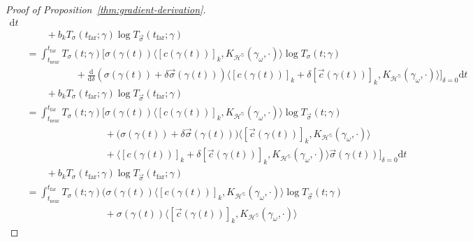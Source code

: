 \documentclass{article}
\newcommand{\dif}{\mathrm{d}}
\newcommand{\near}{\mathrm{near}}
\newcommand{\far}{\mathrm{far}}
\begin{document}
\begin{proof}[Proof of Proposition~\ref{thm:gradient-derivation}]
{\begin{align*}
                \dif t
            \\ &\qquad + b_k T_{\sigma}(t_\far;\gamma) \log T_{\vec{\sigma}}(t_\far;\gamma)
        \\ &=
            \int_{t_\near}^{t_\far}
                T_{\sigma}(t;\gamma)
                \biggl[
                    \sigma(\gamma(t))
                    \langle [c(\gamma(t))]_k, K_{\mathcal{H}^\mathbb{S}}(\gamma_\omega, \cdot) \rangle
                    \log T_{\sigma}(t;\gamma)
                    \\ &\qquad\qquad\quad + \frac{\dif}{\dif \delta}
                    (\sigma(\gamma(t)) + \delta \vec{\sigma}(\gamma(t)))
                    \langle [c(\gamma(t))]_k + \delta [\vec{c}(\gamma(t))]_k, K_{\mathcal{H}^\mathbb{S}}(\gamma_\omega, \cdot) \rangle
                \biggr]_{\delta=0}
                \dif t
            \\ &\qquad + b_k T_{\sigma}(t_\far;\gamma) \log T_{\vec{\sigma}}(t_\far;\gamma)
        \\ &=
            \int_{t_\near}^{t_\far}
                T_{\sigma}(t;\gamma)
                \biggl[
                    \sigma(\gamma(t))
                    \langle [c(\gamma(t))]_k, K_{\mathcal{H}^\mathbb{S}}(\gamma_\omega, \cdot) \rangle
                    \log T_{\vec{\sigma}}(t;\gamma)
                    \\ &\qquad\qquad\qquad\qquad
                    + \bigl(\sigma(\gamma(t)) + \delta \vec{\sigma}(\gamma(t))\bigr) \langle [\vec{c}(\gamma(t))]_k, K_{\mathcal{H}^\mathbb{S}}(\gamma_\omega, \cdot) \rangle
                    \\ &\qquad\qquad\qquad\qquad
                    + \langle [c(\gamma(t))]_k + \delta [\vec{c}(\gamma(t))]_k, K_{\mathcal{H}^\mathbb{S}}(\gamma_\omega, \cdot) \rangle \vec{\sigma}(\gamma(t))
                \biggr]_{\delta=0}
                \dif t
            \\ &\qquad + b_k T_{\sigma}(t_\far;\gamma) \log T_{\vec{\sigma}}(t_\far;\gamma)
        \\ &=
            \int_{t_\near}^{t_\far}
                T_{\sigma}(t;\gamma)
                \biggl(
                    \sigma(\gamma(t))
                    \langle [c(\gamma(t))]_k, K_{\mathcal{H}^\mathbb{S}}(\gamma_\omega, \cdot) \rangle
                    \log T_{\vec{\sigma}}(t;\gamma)
                    \\ &\qquad\qquad\qquad\qquad
                    + \sigma(\gamma(t)) \langle [\vec{c}(\gamma(t))]_k, K_{\mathcal{H}^\mathbb{S}}(\gamma_\omega, \cdot) \rangle

\end{align*}}
\end{proof}
\end{document}

